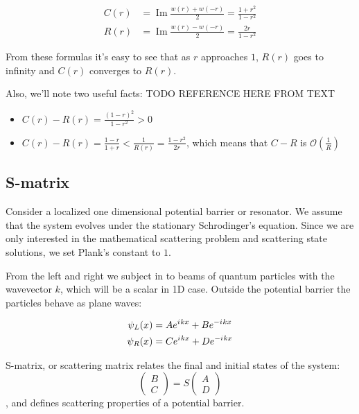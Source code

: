 \documentclass{gCOV2e}
\theoremstyle{plain}%
\theoremstyle{definition}
\theoremstyle{remark}
\newcommand{\mcO}{\mathcal{O}} %
\newcommand{\iu}{{i\mkern1mu}} %
\newcommand{\eexp}[1]{e^{#1}}  %
\begin{document}
\begin{equation}\label{eq:c_and_r}
\begin{aligned}
   C(r) &= \operatorname{Im} \frac{w(r) + w(-r)}{2} = \frac{1 + r^2}{1 - r^2}
\\ R(r) &= \operatorname{Im} \frac{w(r) - w(-r)}{2} = \frac{2 r}{1 - r^2}
\end{aligned}
\end{equation}

From these formulas it's easy to see that as $r$ approaches $1$, $R(r)$ goes to infinity and $C(r)$ converges to $R(r)$.

Also, we'll note two useful facts: TODO REFERENCE HERE FROM TEXT
\begin{itemize}
\item $C(r) - R(r) = \frac{(1 - r)^2}{1 - r^2} > 0$
\item $C(r) - R(r) = \frac{1 - r}{1 + r} < \frac{1}{R(r)} = \frac{1 - r^2}{2 r}$, which means that $C - R$ is $\mcO(\frac{1}{R})$
\end{itemize}

\subsection{S-matrix}\label{sec:smatrix}
Consider a localized one dimensional potential barrier or resonator. We assume that the system evolves under the stationary Schrodinger's equation. Since we are only interested in the mathematical scattering problem and scattering state solutions, we set Plank's constant to $1$.

From the left and right we subject in to beams of quantum particles with the wavevector $k$, which will be a scalar in 1D case. Outside the potential barrier the particles behave as plane waves:

\begin{equation}\label{eq:wlwl}
\begin{aligned}
   \psi_L(x) &= A \eexp{\iu k x} + B \eexp{-\iu k x}
\\ \psi_R(x) &= C \eexp{\iu k x} + D \eexp{-\iu k x}
\end{aligned}
\end{equation}

S-matrix, or scattering matrix relates the final and initial states of the system:
\begin{equation}\label{eq:smatrix}
\begin{pmatrix} B \\ C \end{pmatrix} = S \begin{pmatrix} A \\ D \end{pmatrix}
\end{equation}
, and defines scattering properties of a potential barrier.
\end{document}
